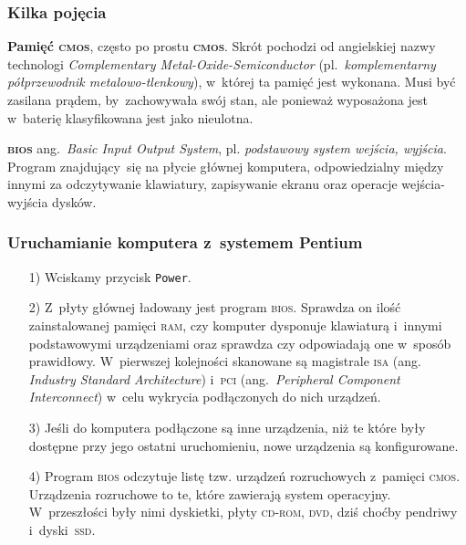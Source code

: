 \documentclass[10pt,t]{beamer}
\begin{document}
\begin{frame}
  \frametitle{Kilka pojęcia}


  \textbf{Pamięć \textsc{cmos}}, często po prostu \textbf{\textsc{cmos}}.
  Skrót pochodzi od angielskiej nazwy technologi \textit{Complementary
    Metal-Oxide-Semiconductor} (pl.~\textit{komplementarny półprzewodnik
    metalowo-tlenkowy}), w~której ta pamięć jest wykonana. Musi być zasilana
  prądem, by~zachowywała swój stan, ale ponieważ wyposażona jest w~baterię
  klasyfikowana jest jako nieulotna.

  \textbf{\textsc{bios}} ang.~\textit{Basic Input Output System}, pl.
  \textit{podstawowy system wejścia, wyjścia}. Program znajdujący~się
  na płycie głównej komputera, odpowiedzialny między innymi za odczytywanie
  klawiatury, zapisywanie ekranu oraz operacje wejścia-wyjścia dysków.

\end{frame}





\begin{frame}
  \frametitle{Uruchamianie komputera z~systemem Pentium}


  \begin{itemize}

  \item[1)] Wciskamy przycisk \texttt{Power}.

  \item[2)] Z~płyty głównej ładowany jest program \textsc{bios}. Sprawdza on
    ilość zainstalowanej pamięci \textsc{ram}, czy komputer dysponuje
    klawiaturą i~innymi podstawowymi urządzeniami oraz sprawdza czy
    odpowiadają one w~sposób prawidłowy. W~pierwszej kolejności skanowane
    są magistrale \textsc{isa} (ang. \textit{Industry Standard
      Architecture}) i~\textsc{pci} (ang.~\textit{Peripheral Component
      Interconnect}) w~celu wykrycia podłączonych do nich urządzeń.

  \item[3)] Jeśli do komputera podłączone są inne urządzenia, niż te które
    były dostępne przy jego ostatni uruchomieniu, nowe urządzenia są
    konfigurowane.

  \item[4)] Program \textsc{bios} odczytuje listę tzw. urządzeń rozruchowych
    z~pamięci \textsc{cmos}. Urządzenia rozruchowe to te, które zawierają
    system operacyjny. W~przeszłości były nimi dyskietki, płyty
    \textsc{cd}-\textsc{rom}, \textsc{dvd}, dziś choćby pendriwy
    i~dyski~\textsc{ssd}.

  \end{itemize}

\end{frame}
\end{document}
